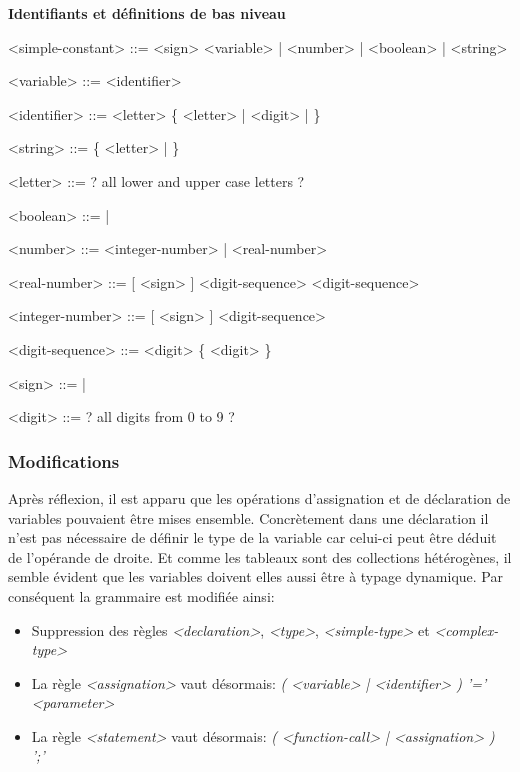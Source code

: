 \documentclass[french]{article}
\begin{document}
				\textbf{Identifiants et définitions de bas niveau}
				\begin{grammar}
					<simple-constant> ::= <sign> <variable> | <number> | <boolean> | <string>
					
					<variable> ::= <identifier>
					
					<identifier> ::= <letter> \{ <letter> | <digit> | \lit{\_} \}
					
					<string> ::=  \{ <letter> | \lit{ } \} 
					
					<letter> ::= ? all lower and upper case letters ? 
					
					<boolean> ::=  | 
					
					<number> ::= <integer-number> | <real-number>
					
					<real-number> ::= [ <sign> ] <digit-sequence>  <digit-sequence>
					
					<integer-number> ::= [ <sign> ] <digit-sequence>
					
					<digit-sequence> ::= <digit> \{ <digit> \}
					
					<sign> ::= \lit{+} | \lit{-} 
					
					<digit> ::= ? all digits from 0 to 9 ? 
				\end{grammar}
				
			\subsubsection{Modifications}
				Après réflexion, il est apparu que les opérations d'assignation et de déclaration de variables pouvaient être mises ensemble. Concrètement dans une déclaration il n'est pas nécessaire de définir le type de la variable car celui-ci peut être déduit de l'opérande de droite. Et comme les tableaux sont des collections hétérogènes, il semble évident que les variables doivent elles aussi être à typage dynamique. Par conséquent la grammaire est modifiée ainsi:
				\begin{itemize}
					\item Suppression des règles \textit{<declaration>}, \textit{<type>}, \textit{<simple-type>} et \textit{<complex-type>}
					\item La règle \textit{<assignation>} vaut désormais: \textit{( <variable> | <identifier> ) '=' <parameter>}
					\item La règle \textit{<statement>} vaut désormais: \textit{( <function-call> | <assignation> ) ';'}
				\end{itemize} 
				
\end{document}
